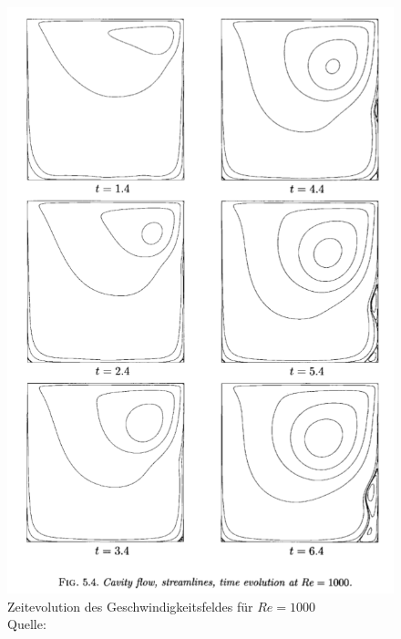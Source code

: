 	\begin{figure}[H]
		\center
		\includegraphics[scale = 0.5]{screenshots/literatur-time-01.png}
		\caption{Zeitevolution des Geschwindigkeitsfeldes für $Re=1000$ \\ Quelle: \cite{nsfd} }
		\label{fig:literatur time 01}
	\end{figure}


